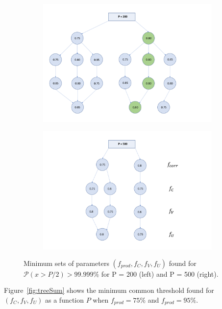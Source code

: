 \begin{figure}[H]
\centering
   \begin{subfigure}[b]{0.45\textwidth}
       \includegraphics[width=\textwidth]{Figures/tree_P_200}
   \end{subfigure}
   \begin{subfigure}[b]{0.47\textwidth}
       \includegraphics[width=\textwidth]{Figures/tree_P_500}
   \end{subfigure}
   \caption{Minimum sets of parameters $(f_{prod}, f_C, f_V, f_U)$ found for $\mathcal{P}(x>P/2) > 99.999\%$ for P = 200 (left) and P = 500 (right).}
   \label{fig:tree}
\end{figure}

Figure~\ref{fig:treeSum} shows the minimum common threshold found for $(f_C, f_V, f_U)$ as a function $P$ when $f_{prod} = 75\%$ and $f_{prod} = 95\%$. \\


